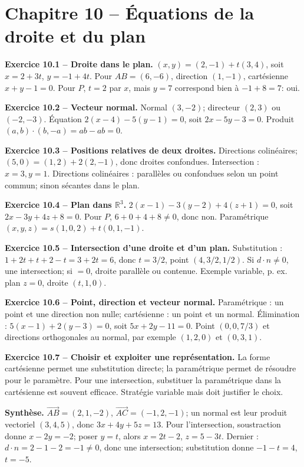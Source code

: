 \documentclass[11pt,a4paper,openany]{book}
\newcommand{\R}{\mathbb{R}}\newcommand{\N}{\mathbb{N}}\newcommand{\Z}{\mathbb{Z}}\newcommand{\Q}{\mathbb{Q}}
\newcommand{\vect}[1]{\overrightarrow{#1}}\newcommand{\norm}[1]{\left\lVert#1\right\rVert}\newcommand{\abs}[1]{\left\lvert#1\right\rvert}
\begin{document}
\chapter*{Chapitre 10 -- Équations de la droite et du plan}
\begin{answerbox}
\textbf{Exercice 10.1 -- Droite dans le plan.} $(x,y)=(2,-1)+t(3,4)$, soit $x=2+3t$, $y=-1+4t$. Pour $AB=(6,-6)$, direction $(1,-1)$, cartésienne $x+y-1=0$. Pour $P$, $t=2$ par $x$, mais $y=7$ correspond bien à $-1+8=7$: oui.\par
\textbf{Exercice 10.2 -- Vecteur normal.} Normal $(3,-2)$; directeur $(2,3)$ ou $(-2,-3)$. Équation $2(x-4)-5(y-1)=0$, soit $2x-5y-3=0$. Produit $(a,b)\cdot(b,-a)=ab-ab=0$.\par
\textbf{Exercice 10.3 -- Positions relatives de deux droites.} Directions colinéaires; $(5,0)=(1,2)+2(2,-1)$, donc droites confondues. Intersection : $x=3,y=1$. Directions colinéaires : parallèles ou confondues selon un point commun; sinon sécantes dans le plan.\par
\textbf{Exercice 10.4 -- Plan dans \texorpdfstring{$\R^3$}{R3}.} $2(x-1)-3(y-2)+4(z+1)=0$, soit $2x-3y+4z+8=0$. Pour $P$, $6+0+4+8\neq0$, donc non. Paramétrique $(x,y,z)=s(1,0,2)+t(0,1,-1)$.\par
\textbf{Exercice 10.5 -- Intersection d'une droite et d'un plan.} Substitution : $1+2t+t+2-t=3+2t=6$, donc $t=3/2$, point $(4,3/2,1/2)$. Si $d\cdot n\neq0$, une intersection; si $=0$, droite parallèle ou contenue. Exemple variable, p. ex. plan $z=0$, droite $(t,1,0)$.\par
\textbf{Exercice 10.6 -- Point, direction et vecteur normal.} Paramétrique : un point et une direction non nulle; cartésienne : un point et un normal. Élimination : $5(x-1)+2(y-3)=0$, soit $5x+2y-11=0$. Point $(0,0,7/3)$ et directions orthogonales au normal, par exemple $(1,2,0)$ et $(0,3,1)$.\par
\textbf{Exercice 10.7 -- Choisir et exploiter une représentation.} La forme cartésienne permet une substitution directe; la paramétrique permet de résoudre pour le paramètre. Pour une intersection, substituer la paramétrique dans la cartésienne est souvent efficace. Stratégie variable mais doit justifier le choix.\par
\medskip\textbf{Synthèse.} $\vect{AB}=(2,1,-2)$, $\vect{AC}=(-1,2,-1)$; un normal est leur produit vectoriel $(3,4,5)$, donc $3x+4y+5z=13$. Pour l'intersection, soustraction donne $x-2y=-2$; poser $y=t$, alors $x=2t-2$, $z=5-3t$. Dernier : $d\cdot n=2-1-2=-1\neq0$, donc une intersection; substitution donne $-1-t=4$, $t=-5$.
\end{answerbox}
\end{document}
